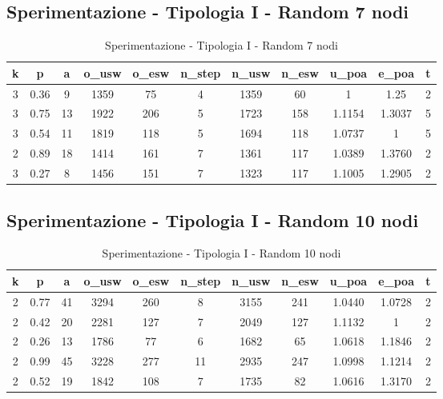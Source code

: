 \subsection{Sperimentazione - Tipologia I - Random 7 nodi}

\begin{table}[H]
\centering
\scalebox{0.9} {
\begin{tabular}{|c|c|c|c|c|c|c|c|c|c|c|}
\hline
\textbf{k} & \textbf{p} & \textbf{a} & \textbf{o\_usw} & \textbf{o\_esw} & \textbf{n\_step} & \textbf{n\_usw} & \textbf{n\_esw} & \textbf{u\_poa} & \textbf{e\_poa} & \textbf{t} \\ \hline
3 & 0.36 & 9 & 1359 & 75 & 4 & 1359 & 60 & 1 & 1.25 & 2 \\ \hline
3 & 0.75 & 13 & 1922 & 206 & 5 & 1723 & 158 & 1.1154 & 1.3037 & 5 \\ \hline
3 & 0.54 & 11 & 1819 & 118 & 5 & 1694 & 118 & 1.0737 & 1 & 5 \\ \hline
2 & 0.89 & 18 & 1414 & 161 & 7 & 1361 & 117 & 1.0389 & 1.3760 & 2 \\ \hline
3 & 0.27 & 8 & 1456 & 151 & 7 & 1323 & 117 & 1.1005 & 1.2905 & 2 \\ \hline
\end{tabular}
}
\caption{Sperimentazione - Tipologia I - Random 7 nodi}
\label{tab:sperimentazione-tipo1-7nodi}
\end{table}


\subsection{Sperimentazione - Tipologia I - Random 10 nodi}

\begin{table}[H]
\centering
\scalebox{0.9} {
\begin{tabular}{|c|c|c|c|c|c|c|c|c|c|c|}
\hline
\textbf{k} & \textbf{p} & \textbf{a} & \textbf{o\_usw} & \textbf{o\_esw} & \textbf{n\_step} & \textbf{n\_usw} & \textbf{n\_esw} & \textbf{u\_poa} & \textbf{e\_poa} & \textbf{t} \\ \hline
2 & 0.77 & 41 & 3294 & 260 & 8 & 3155 & 241 & 1.0440 & 1.0728 & 2 \\ \hline
2 & 0.42 & 20 & 2281 & 127 & 7 & 2049 & 127 & 1.1132 & 1 & 2 \\ \hline
2 & 0.26 & 13 & 1786 & 77 & 6 & 1682 & 65 & 1.0618 & 1.1846 & 2 \\ \hline
2 & 0.99 & 45 & 3228 & 277 & 11 & 2935 & 247 & 1.0998 & 1.1214 & 2 \\ \hline
2 & 0.52 & 19 & 1842 & 108 & 7 & 1735 & 82 & 1.0616 & 1.3170 & 2 \\ \hline
\end{tabular}
}
\caption{Sperimentazione - Tipologia I - Random 10 nodi}
\label{tab:sperimentazione-tipo1-10nodi}
\end{table}

